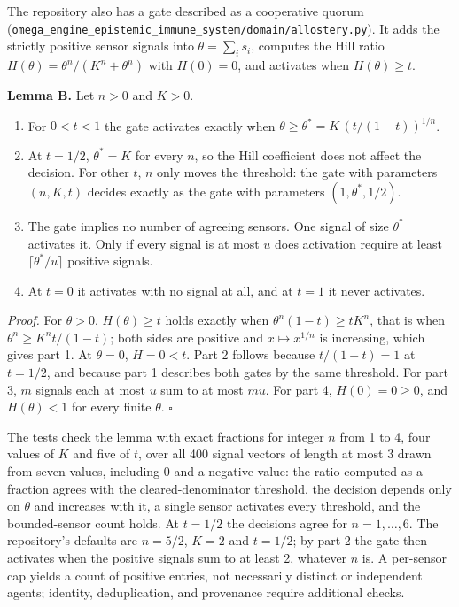 \documentclass[
  11pt,
]{article}
\providecommand{\tightlist}{%
  \setlength{\itemsep}{0pt}\setlength{\parskip}{0pt}}
\begin{document}
The repository also has a gate described as a cooperative quorum
(\texttt{\nolinkurl{omega_engine_epistemic_immune_system/domain/allostery.py}}).
It adds the strictly positive sensor signals into
\(\theta = \sum_i s_i\), computes the Hill ratio
\(H(\theta) = \theta^n / (K^n + \theta^n)\) with \(H(0) = 0\), and
activates when \(H(\theta) \geq t\).

\textbf{Lemma B.} Let \(n > 0\) and \(K > 0\).

\begin{enumerate}
\def\labelenumi{\arabic{enumi}.}
\tightlist
\item
  For \(0 < t < 1\) the gate activates exactly when
  \(\theta \geq \theta^* = K \, (t / (1 - t))^{1/n}\).
\item
  At \(t = 1/2\), \(\theta^* = K\) for every \(n\), so the Hill
  coefficient does not affect the decision. For other \(t\), \(n\) only
  moves the threshold: the gate with parameters \((n, K, t)\) decides
  exactly as the gate with parameters \((1, \theta^*, 1/2)\).
\item
  The gate implies no number of agreeing sensors. One signal of size
  \(\theta^*\) activates it. Only if every signal is at most \(u\) does
  activation require at least \(\lceil \theta^* / u \rceil\) positive
  signals.
\item
  At \(t = 0\) it activates with no signal at all, and at \(t = 1\) it
  never activates.
\end{enumerate}

\emph{Proof.} For \(\theta > 0\), \(H(\theta) \geq t\) holds exactly
when \(\theta^n (1 - t) \geq t K^n\), that is when
\(\theta^n \geq K^n t / (1 - t)\); both sides are positive and
\(x \mapsto x^{1/n}\) is increasing, which gives part 1. At
\(\theta = 0\), \(H = 0 < t\). Part 2 follows because
\(t / (1 - t) = 1\) at \(t = 1/2\), and because part 1 describes both
gates by the same threshold. For part 3, \(m\) signals each at most
\(u\) sum to at most \(mu\). For part 4, \(H(0) = 0 \geq 0\), and
\(H(\theta) < 1\) for every finite \(\theta\). \(\square\)

The tests check the lemma with exact fractions for integer \(n\) from 1
to 4, four values of \(K\) and five of \(t\), over all 400 signal
vectors of length at most 3 drawn from seven values, including 0 and a
negative value: the ratio computed as a fraction agrees with the
cleared-denominator threshold, the decision depends only on \(\theta\)
and increases with it, a single sensor activates every threshold, and
the bounded-sensor count holds. At \(t = 1/2\) the decisions agree for
\(n = 1, \ldots, 6\). The repository's defaults are \(n = 5/2\),
\(K = 2\) and \(t = 1/2\); by part 2 the gate then activates when the
positive signals sum to at least 2, whatever \(n\) is. A per-sensor cap
yields a count of positive entries, not necessarily distinct or
independent agents; identity, deduplication, and provenance require
additional checks.
\end{document}

